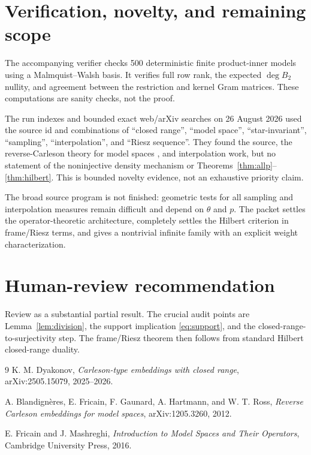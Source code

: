 \documentclass[10pt]{article}
\begin{document}
\section{Verification, novelty, and remaining scope}

The accompanying verifier checks 500 deterministic finite product-inner
models using a Malmquist--Walsh basis.  It verifies full row rank, the expected
$\deg B_2$ nullity, and agreement between the restriction and kernel Gram
matrices.  These computations are sanity checks, not the proof.

The run indexes and bounded exact web/arXiv searches on 26 August 2026 used
the source id and combinations of ``closed range'', ``model space'',
``star-invariant'', ``sampling'', ``interpolation'', and ``Riesz sequence''.
They found the source, the reverse-Carleson theory for model spaces
\cite{BFGHR2012}, and interpolation work, but no statement of the
noninjective density mechanism or Theorems~\ref{thm:allp}--\ref{thm:hilbert}.
This is bounded novelty evidence, not an exhaustive priority claim.

The broad source program is not finished: geometric tests for all sampling
and interpolation measures remain difficult and depend on $\theta$ and $p$.
The packet settles the operator-theoretic architecture, completely settles
the Hilbert criterion in frame/Riesz terms, and gives a nontrivial infinite
family with an explicit weight characterization.

\section{Human-review recommendation}

Review as a substantial partial result.  The crucial audit points are
Lemma~\ref{lem:division}, the support implication \eqref{eq:support}, and the
closed-range-to-surjectivity step.  The frame/Riesz theorem then follows from
standard Hilbert closed-range duality.

\begin{thebibliography}{9}
K. M. Dyakonov,
\emph{Carleson-type embeddings with closed range},
arXiv:2505.15079, 2025--2026.

A. Blandign\`eres, E. Fricain, F. Gaunard, A. Hartmann, and W. T. Ross,
\emph{Reverse Carleson embeddings for model spaces},
arXiv:1205.3260, 2012.

E. Fricain and J. Mashreghi,
\emph{Introduction to Model Spaces and Their Operators},
Cambridge University Press, 2016.
\end{thebibliography}
\end{document}
